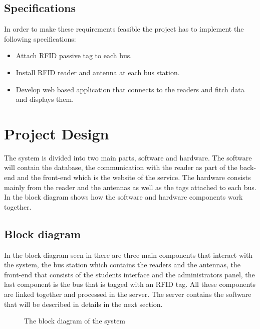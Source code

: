 \documentclass[a4paper,twoside]{article}
\begin{document}
\subsection{Specifications}
In order to make these requirements feasible the project has to implement the following specifications:
\begin{itemize}
\item 
Attach RFID passive tag to each bus.
\item
Install RFID reader and antenna at each bus station.
\item
Develop web based application that connects to the readers and fitch data and displays them.
\end{itemize}

\section{Project Design}
The system is divided into two main parts, software and hardware. The software will contain the database, the communication with the reader as part of the back-end and the front-end which is the website of the service. The hardware consists mainly from the reader and the antennas as well as the tags attached to each bus. In  the block diagram shows how the software and hardware components work together.
\subsection{Block diagram}
In the block diagram seen in  there are three main components that interact with the system, the bus station which contains the readers and the antennas, the front-end that consists of the students interface and the administrators panel, the last component is the bus that is tagged with an RFID tag. All these components are linked together and processed in the server. The server contains the software that will be described in details in the next section.
\begin{figure}
\centering
{}
\caption{The block diagram of the system}
\label{blockdiagram}
\end{figure}
%
\end{document}
